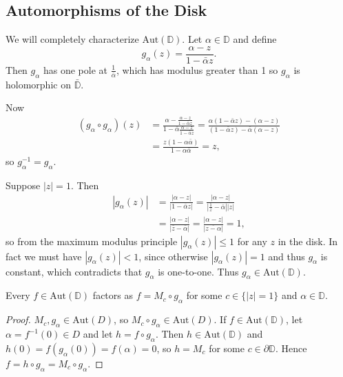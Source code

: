 \subsection{Automorphisms of the Disk}
We will completely characterize $\mathrm{Aut}(\mathbb{D})$.
Let $\alpha \in \mathbb{D}$ and define
$$
g_\alpha(z) = \frac{\alpha - z}{1 - \bar{\alpha} z}.
$$
Then $g_\alpha$ has one pole at $\frac{1}{\bar{\alpha}}$, which has
modulus greater than 1 so $g_\alpha$ is holomorphic on $\bar{\mathbb{D}}$.

Now
\begin{align*}
   (g_\alpha \circ g_\alpha)(z)
&= \frac{\alpha - \frac{\alpha - z}
                       {1 - \bar{\alpha} z}}
        {1 - \bar{\alpha} \frac{\alpha - z}
                               {1 - \bar{\alpha} z}}
 = \frac{\alpha(1 - \bar{\alpha} z) - (\alpha - z)}
        {(1 - \bar{\alpha} z) - \bar{\alpha}(\alpha - z)} \\
&= \frac{z(1 - \alpha \bar{\alpha})}
        {1 - \alpha \bar{\alpha}}
 = z,
\end{align*}
so $g_\alpha^{-1} = g_\alpha$.

Suppose $|z| = 1$. Then
\begin{align*}
   |g_\alpha(z)|
&= \frac{|\alpha - z|}
        {|1 - \bar{\alpha} z|}
 = \frac{|\alpha - z|}
        {\left|\frac{1}{z} - \bar{\alpha}\right| |z|} \\
&= \frac{|\alpha - z|}
        {|\bar{z} - \bar{\alpha}|}
 = \frac{|\alpha - z|}
        {|\overline{z - \alpha}|}
 = 1,
\end{align*}
so from the maximum modulus principle $|g_\alpha(z)| \leq 1$ for
any $z$ in the disk. In fact we must have $|g_\alpha(z)| < 1$, since
otherwise $|g_\alpha(z)| = 1$ and thus $g_\alpha$ is constant, which
contradicts that $g_\alpha$ is one-to-one. Thus
$g_\alpha \in \mathrm{Aut}(\mathbb{D})$.

\begin{theorem}
Every $f \in \mathrm{Aut}(\mathbb{D})$ factors as
$f = M_c \circ g_\alpha$ for some $c \in \{ |z| = 1 \}$ and
$\alpha \in \mathbb{D}$.
\end{theorem}

\begin{proof}
$M_c, g_\alpha \in \mathrm{Aut}(D)$, so
$M_c \circ g_\alpha \in \mathrm{Aut}(D)$.
If $f \in \mathrm{Aut}(\mathbb{D})$, let
$\alpha = f^{-1}(0) \in D$ and let
$h = f \circ g_\alpha$. Then
$h \in \mathrm{Aut}(\mathbb{D})$ and
$h(0) = f(g_\alpha(0)) = f(\alpha) = 0$, so
$h = M_c$ for some $c \in \partial \mathbb{D}$.
Hence $f = h \circ g_\alpha = M_c \circ g_\alpha$.
\end{proof}

